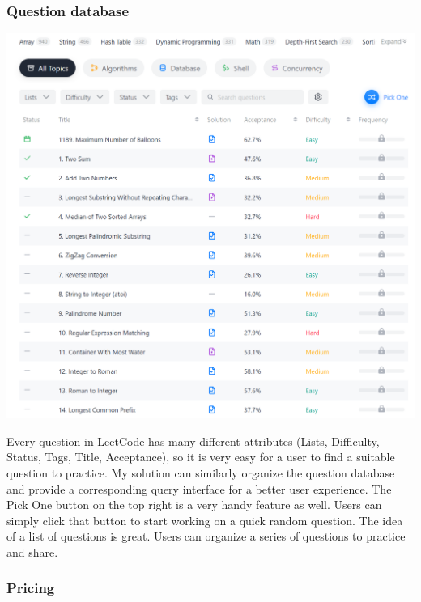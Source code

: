 \documentclass[a4paper]{report}
\begin{document}
\subsubsection{Question database}

\includegraphics[width=\linewidth]{LeetCode-Problems}

Every question in LeetCode has many different attributes (Lists, Difficulty, Status, Tags, Title, Acceptance), so it is very easy for a user to find a suitable question to practice. My solution can similarly organize the question database and provide a corresponding query interface for a better user experience. The Pick One button on the top right is a very handy feature as well. Users can simply click that button to start working on a quick random question. The idea of a list of questions is great. Users can organize a series of questions to practice and share.

\subsubsection{Pricing}
\end{document}
